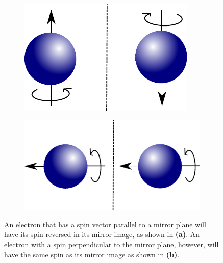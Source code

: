 \begin{figure}[h!]
\centering
\begin{subfigure}{.39\textwidth}
  \centering
  \includegraphics[width=1.0\linewidth]{Figures/UpDownSpinMirror}
  \caption{}
\end{subfigure}%
\hspace{1cm}
\begin{subfigure}{.5\textwidth}
  \centering
  \includegraphics[width=1.0\linewidth]{Figures/LeftSpinMirror}
  \caption{}
\end{subfigure}
\caption{An electron that has a spin vector parallel to a mirror plane will have its spin reversed in its mirror image, as shown in \textbf{(a)}. An electron with a spin perpendicular to the mirror plane, however, will have the same spin as its mirror image as shown in \textbf{(b)}.}
\label{fig:SpinMirror}
\end{figure}
